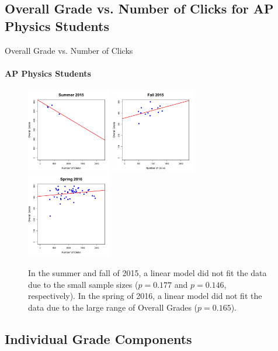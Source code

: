 \documentclass[xcolor=x11names,compress]{beamer}
\begin{document}
\subsection{Overall Grade vs. Number of Clicks for AP Physics Students}

\begin{frame}{Overall Grade vs. Number of Clicks}
	\framesubtitle{AP Physics Students}
	\begin{figure}
		\centering
		\includegraphics[width=0.33\textwidth]{img/overall_grade_vs_clicks_su15_ap_students.pdf}
		\includegraphics[width=0.33\textwidth]{img/overall_grade_vs_clicks_fa15_ap_students.pdf}
		\includegraphics[width=0.33\textwidth]{img/overall_grade_vs_clicks_sp16_ap_students.pdf}
		\caption{In the summer and fall of 2015, a linear model did not fit the data due to the small sample sizes ($p = 0.177$ and $p = 0.146$, respectively). In the spring of 2016, a linear model did not fit the data due to the large range of Overall Grades ($p = 0.165$).}
		\label{fig:overall_grade_vs_clicks_ap_students}
	\end{figure}
\end{frame}

\subsection{Individual Grade Components}
\end{document}
